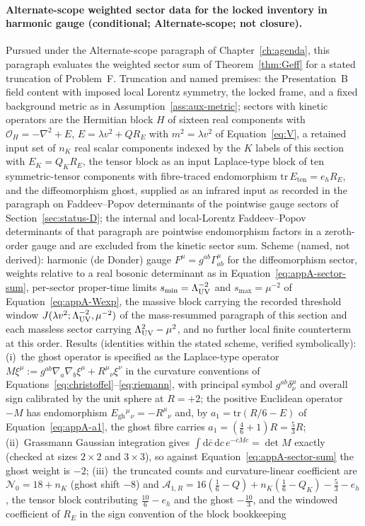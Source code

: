 \paragraph{Alternate-scope weighted sector data for the locked inventory in harmonic gauge (conditional; Alternate-scope; not closure).} Pursued under the Alternate-scope paragraph of Chapter~\ref{ch:agenda}, this paragraph evaluates the weighted sector sum of Theorem~\ref{thm:Geff} for a stated truncation of Problem~F. Truncation and named premises: the Presentation~B field content with imposed local Lorentz symmetry, the locked frame, and a fixed background metric as in Assumption~\ref{ass:aux-metric}; sectors with kinetic operators are the Hermitian block \(H\) of sixteen real components with \(\mathcal O_H=-\nabla^2+E\), \(E=\lambda v^2+Q R_E\) with \(m^2=\lambda v^2\) of Equation~\eqref{eq:V}, a retained input set of \(n_K\) real scalar components indexed by the \(K\) labels of this section with \(E_K=Q_K R_E\), the tensor block as an input Laplace-type block of ten symmetric-tensor components with fibre-traced endomorphism \(\mathrm{tr}\,E_{\mathrm{ten}}=e_h R_E\), and the diffeomorphism ghost, supplied as an infrared input as recorded in the paragraph on Faddeev--Popov determinants of the pointwise gauge sectors of Section~\ref{sec:status-D}; the internal and local-Lorentz Faddeev--Popov determinants of that paragraph are pointwise endomorphism factors in a zeroth-order gauge and are excluded from the kinetic sector sum. Scheme (named, not derived): harmonic (de Donder) gauge \(F^\mu=g^{ab}\Gamma^\mu_{ab}\) for the diffeomorphism sector, weights relative to a real bosonic determinant as in Equation~\eqref{eq:appA-sector-sum}, per-sector proper-time limits \(s_{\min}=\Lambda_{\mathrm{UV}}^{-2}\) and \(s_{\max}=\mu^{-2}\) of Equation~\eqref{eq:appA-Wexp}, the massive block carrying the recorded threshold window \(J(\lambda v^2;\Lambda_{\mathrm{UV}}^{-2},\mu^{-2})\) of the mass-resummed paragraph of this section and each massless sector carrying \(\Lambda_{\mathrm{UV}}^2-\mu^2\), and no further local finite counterterm at this order. Results (identities within the stated scheme, verified symbolically): (i)~the ghost operator is specified as the Laplace-type operator \(M\xi^\mu:=g^{ab}\nabla_a\nabla_b\xi^\mu+R^\mu{}_\nu\xi^\nu\) in the curvature conventions of Equations~\eqref{eq:christoffel}--\eqref{eq:riemann}, with principal symbol \(g^{ab}\delta^\mu_\nu\) and overall sign calibrated by the unit sphere at \(R=+2\); the positive Euclidean operator \(-M\) has endomorphism \(E_{\mathrm{gh}}{}^\mu{}_\nu=-R^\mu{}_\nu\) and, by \(a_1=\mathrm{tr}(R/6-E)\) of Equation~\eqref{eq:appA-a1}, the ghost fibre carries \(a_1=(\tfrac46+1)R=\tfrac53R\); (ii)~Grassmann Gaussian integration gives \(\int\mathrm d\bar c\,\mathrm dc\,e^{-\bar c M c}=\det M\) exactly (checked at sizes \(2\times2\) and \(3\times3\)), so against Equation~\eqref{eq:appA-sector-sum} the ghost weight is \(-2\); (iii)~the truncated counts and curvature-linear coefficient are \(\mathcal N_0=18+n_K\) (ghost shift \(-8\)) and \(\mathcal A_{1,R}=16(\tfrac16-Q)+n_K(\tfrac16-Q_K)-\tfrac53-e_h\), the tensor block contributing \(\tfrac{10}{6}-e_h\) and the ghost \(-\tfrac{10}{3}\), and the windowed coefficient of \(R_E\) in the sign convention of the block bookkeeping 